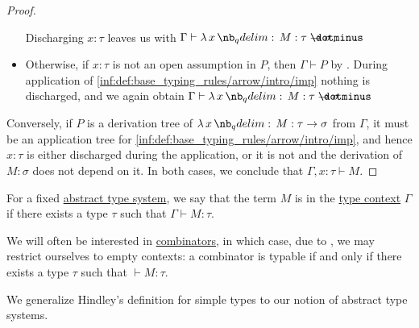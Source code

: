 \begin{proof}
\begin{itemize}
    Discharging \( x: \tau \) leaves us with \( \Gamma \vdash \qabs x M: \tau \synimplies \sigma \).

    \item Otherwise, if \( x: \tau \) is not an open assumption in \( P \), then \( \Gamma \vdash P \) by . During application of \ref{inf:def:base_typing_rules/arrow/intro/imp} nothing is discharged, and we again obtain \( \Gamma \vdash \qabs x M: \tau \synimplies \sigma \).
  \end{itemize}

  \NecessitySubProof* Conversely, if \( P \) is a derivation tree of \( \qabs x M: \tau \to \sigma \) from \( \Gamma \), it must be an application tree for \ref{inf:def:base_typing_rules/arrow/intro/imp}, and hence \( x: \tau \) is either discharged during the application, or it is not and the derivation of \( M: \sigma \) does not depend on it. In both cases, we conclude that \( \Gamma, x: \tau \vdash M \).
\end{proof}

\begin{definition}\label{def:typability}
  For a fixed \hyperref[def:abstract_type_system]{abstract type system}, we say that the term \( M \) is  in the \hyperref[def:type_context]{type context} \( \Gamma \) if there exists a type \( \tau \) such that \( \Gamma \vdash M: \tau \).
\end{definition}
\begin{comments}
  \item We will often be interested in \hyperref[def:lambda_combinator]{combinators}, in which case, due to , we may restrict ourselves to empty contexts: a combinator is typable if and only if there exists a type \( \tau \) such that \( {}\vdash M: \tau \).

  \item We generalize Hindley's definition for simple types to our notion of abstract type systems.
\end{comments}

